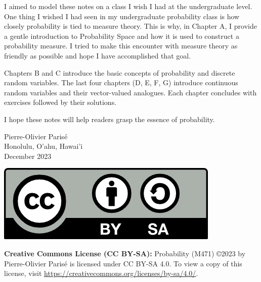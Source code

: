 I aimed to model these notes on a class I wish I had at the undergraduate level. One thing I wished I had seen in my undergraduate probability class is how closely probability is tied to measure theory. This is why, in Chapter A, I provide a gentle introduction to Probability Space and how it is used to construct a probability measure. I tried to make this encounter with measure theory as friendly as possible and hope I have accomplished that goal.

Chapters B and C introduce the basic concepts of probability and discrete random variables. The last four chapters (D, E, F, G) introduce continuous random variables and their vector-valued analogues. Each chapter concludes with exercises followed by their solutions.

I hope these notes will help readers grasp the essence of probability.

\vspace*{1cm}

\begin{flushright}
Pierre-Olivier Paris{\'e}\\
Honolulu, O'ahu, Hawai'i \\
December 2023 
\end{flushright}

\vfill 

\includegraphics[scale=1]{CC-BY-SA.png}

\textbf{Creative Commons License (CC BY-SA):}   Probability (M471) \copyright 2023 by Pierre-Olivier Parisé is licensed under CC BY-SA 4.0. To view a copy of this license, visit \url{https://creativecommons.org/licenses/by-sa/4.0/}.

\newpage 

{}
\tableofcontents

\thispagestyle{empty}

\newpage





